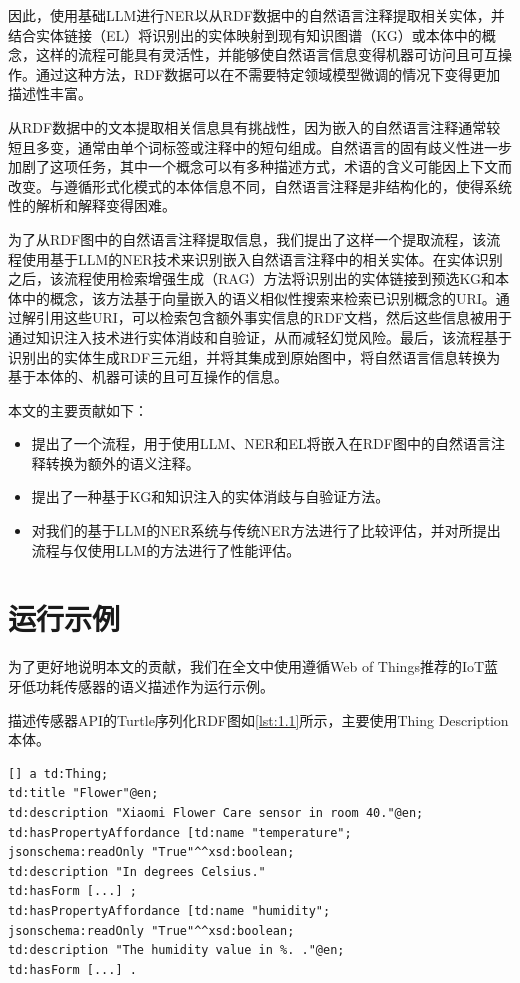 \documentclass[supercite]{Experimental_Report}
\newcommand{\rlst}[1]{\autoref{lst:#1}}
\theoremstyle{definition}
\begin{document}
因此，使用基础LLM进行NER以从RDF数据中的自然语言注释提取相关实体，并结合实体链接（EL）将识别出的实体映射到现有知识图谱（KG）或本体中的概念，这样的流程可能具有灵活性，并能够使自然语言信息变得机器可访问且可互操作。通过这种方法，RDF数据可以在不需要特定领域模型微调的情况下变得更加描述性丰富。

从RDF数据中的文本提取相关信息具有挑战性，因为嵌入的自然语言注释通常较短且多变，通常由单个词标签或注释中的短句组成。自然语言的固有歧义性进一步加剧了这项任务，其中一个概念可以有多种描述方式，术语的含义可能因上下文而改变。与遵循形式化模式的本体信息不同，自然语言注释是非结构化的，使得系统性的解析和解释变得困难。

为了从RDF图中的自然语言注释提取信息，我们提出了这样一个提取流程，该流程使用基于LLM的NER技术来识别嵌入自然语言注释中的相关实体。在实体识别之后，该流程使用检索增强生成（RAG）\cite{ref5}方法将识别出的实体链接到预选KG和本体中的概念，该方法基于向量嵌入的语义相似性搜索来检索已识别概念的URI。通过解引用这些URI，可以检索包含额外事实信息的RDF文档，然后这些信息被用于通过知识注入技术\cite{ref7}进行实体消歧和自验证，从而减轻幻觉风险。最后，该流程基于识别出的实体生成RDF三元组，并将其集成到原始图中，将自然语言信息转换为基于本体的、机器可读的且可互操作的信息。

本文的主要贡献如下：
\begin{itemize}
    \item 提出了一个流程，用于使用LLM、NER和EL将嵌入在RDF图中的自然语言注释转换为额外的语义注释。
    \item 提出了一种基于KG和知识注入的实体消歧与自验证方法。
    \item 对我们的基于LLM的NER系统与传统NER方法进行了比较评估，并对所提出流程与仅使用LLM的方法进行了性能评估。
\end{itemize}

\section{运行示例}

为了更好地说明本文的贡献，我们在全文中使用遵循Web of Things推荐的IoT蓝牙低功耗传感器的语义描述作为运行示例。

描述传感器API的Turtle序列化RDF图如\rlst{1.1}所示，主要使用Thing Description本体\cite{ref1}。

\begin{lstlisting}[language={}, caption={RDF图描述运行示例中介绍的传感器，Turtle序列化，其中包含自然语言文本中的相关信息。为简便起见，td:hasForm语句的内容已省略。}, label={lst:1.1}]
[] a td:Thing;
td:title "Flower"@en;
td:description "Xiaomi Flower Care sensor in room 40."@en;
td:hasPropertyAffordance [td:name "temperature";
jsonschema:readOnly "True"^^xsd:boolean;
td:description "In degrees Celsius."
td:hasForm [...] ;
td:hasPropertyAffordance [td:name "humidity";
jsonschema:readOnly "True"^^xsd:boolean;
td:description "The humidity value in %. ."@en;
td:hasForm [...] .
\end{lstlisting}
\end{document}
